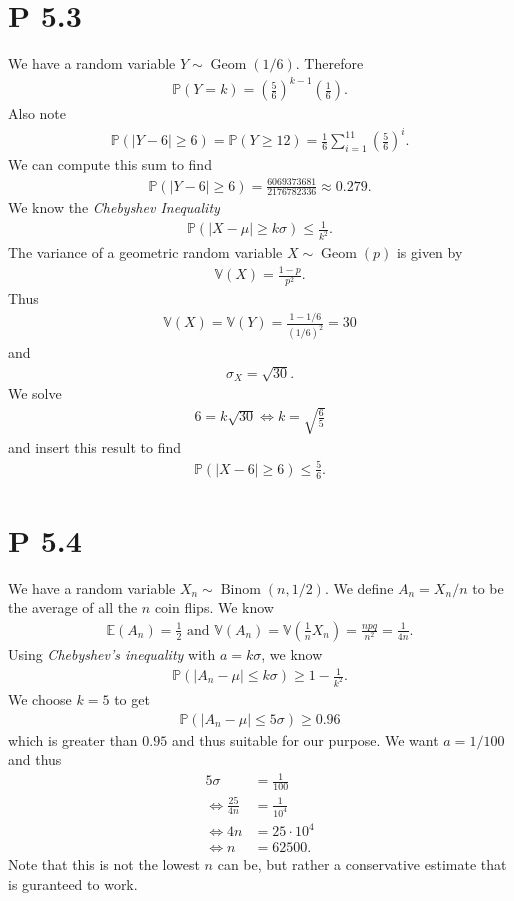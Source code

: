 \documentclass{article}
\renewcommand{\P}{\mathbb{P}}
\newcommand{\E}{\mathbb{E}}
\newcommand{\V}{\mathbb{V}}
\DeclareMathOperator{\Geom}{Geom}
\DeclareMathOperator{\Binom}{Binom}
\begin{document}
\section*{P 5.3}
We have a random variable $Y\sim\Geom(1/6)$. Therefore 
\begin{align*}
  \P(Y=k) = \left(\frac{5}{6}\right)^{k-1}\left(\frac{1}{6}\right).
\end{align*}
Also note
\begin{align*}
  \P(|Y-6|\geq 6) = \P(Y \geq 12) = \frac{1}{6}\sum_{i=1}^{11} \left(\frac{5}{6}\right)^i.
\end{align*}
We can compute this sum to find
\begin{align*}
  \P(|Y-6|\geq 6) = \frac{6069373681}{2176782336} \approx 0.279.
\end{align*}
We know the \emph{Chebyshev Inequality}
\begin{align*}
  \P(|X-\mu|\geq k\sigma) \leq \frac{1}{k^2}.
\end{align*}
The variance of a geometric random variable $X\sim\Geom(p)$ is given by
\begin{align*}
  \V(X) = \frac{1-p}{p^2}.
\end{align*}
Thus
\begin{align*}
  \V(X) = \V(Y) = \frac{1-1/6}{(1/6)^2} = 30
\end{align*}
and
\begin{align*}
  \sigma_X = \sqrt{30}.
\end{align*}
We solve
\begin{align*}
  6 = k\sqrt{30} \Leftrightarrow k = \sqrt{\frac{6}{5}}
\end{align*}
and insert this result to find
\begin{align*}
  \P(|X-6| \geq 6) \leq \frac{5}{6}.
\end{align*}
\section*{P 5.4}
We have a random variable $X_n\sim\Binom(n,1/2)$. We define
$A_n = X_n / n$ to be the average of all the $n$ coin flips. 
We know
\begin{align*}
  \E(A_n) = \frac{1}{2} \text{ and } 
  \V(A_n) = \V\left(\frac{1}{n}X_n\right) = \frac{npq}{n^2} = \frac{1}{4n}.
\end{align*}
Using \emph{Chebyshev's inequality} with $a=k\sigma$, we know
\begin{align*}
  \P(|A_n - \mu| \leq k\sigma) \geq 1 - \frac{1}{k^2}.
\end{align*}
We choose $k=5$ to get
\begin{align*}
  \P(|A_n - \mu| \leq 5\sigma) \geq 0.96
\end{align*}
which is greater than $0.95$ and thus suitable for our purpose.
We want $a=1/100$ and thus
\begin{align*}
  5\sigma &= \frac{1}{100}\\
  \Leftrightarrow \frac{25}{4n} &= \frac{1}{10^4}\\
  \Leftrightarrow 4n &= 25\cdot 10^4\\
  \Leftrightarrow n &= 62500.
\end{align*}
Note that this is not the lowest $n$ can be, but rather a conservative
estimate that is guranteed to work.
\end{document}
